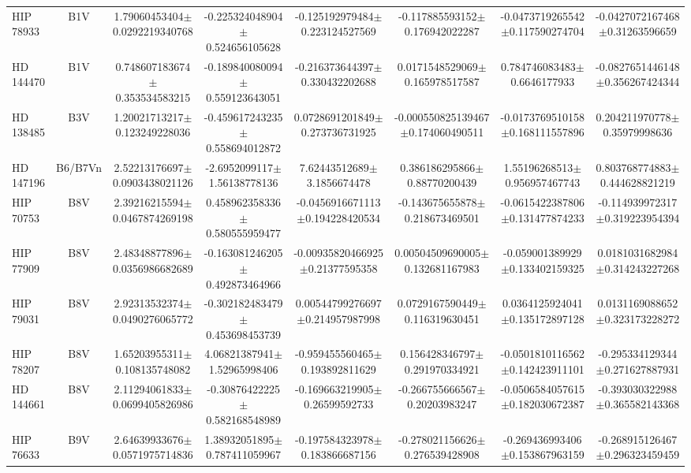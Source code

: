 \begin{table}
\begin{center}
\begin{tabular}{l|c|c|c|c|c|c|c}
HIP 78933 & B1V & 1.79060453404$\pm$0.0292219340768 & -0.225324048904$\pm$0.524656105628 & -0.125192979484$\pm$0.223124527569 & -0.117885593152$\pm$0.176942022287 & -0.0473719265542$\pm$0.117590274704 & -0.0427072167468$\pm$0.31263596659 \\
HD 144470 & B1V & 0.748607183674$\pm$0.353534583215 & -0.189840080094$\pm$0.559123643051 & -0.216373644397$\pm$0.330432202688 & 0.0171548529069$\pm$0.165978517587 & 0.784746083483$\pm$0.6646177933 & -0.0827651446148$\pm$0.356267424344 \\
HD 138485 & B3V & 1.20021713217$\pm$0.123249228036 & -0.459617243235$\pm$0.558694012872 & 0.0728691201849$\pm$0.273736731925 & -0.000550825139467$\pm$0.174060490511 & -0.0173769510158$\pm$0.168111557896 & 0.204211970778$\pm$0.35979998636 \\
HD 147196 & B6/B7Vn & 2.52213176697$\pm$0.0903438021126 & -2.6952099117$\pm$1.56138778136 & 7.62443512689$\pm$3.1856674478 & 0.386186295866$\pm$0.88770200439 & 1.55196268513$\pm$0.956957467743 & 0.803768774883$\pm$0.444628821219 \\
HIP 70753 & B8V & 2.39216215594$\pm$0.0467874269198 & 0.458962358336$\pm$0.580555959477 & -0.0456916671113$\pm$0.194228420534 & -0.143675655878$\pm$0.218673469501 & -0.0615422387806$\pm$0.131477874233 & -0.114939972317$\pm$0.319223954394 \\
HIP 77909 & B8V & 2.48348877896$\pm$0.0356986682689 & -0.163081246205$\pm$0.492873464966 & -0.00935820466925$\pm$0.21377595358 & 0.00504509690005$\pm$0.132681167983 & -0.059001389929$\pm$0.133402159325 & 0.0181031682984$\pm$0.314243227268 \\
HIP 79031 & B8V & 2.92313532374$\pm$0.0490276065772 & -0.302182483479$\pm$0.453698453739 & 0.00544799276697$\pm$0.214957987998 & 0.0729167590449$\pm$0.116319630451 & 0.0364125924041$\pm$0.135172897128 & 0.0131169088652$\pm$0.323173228272 \\
HIP 78207 & B8V & 1.65203955311$\pm$0.108135748082 & 4.06821387941$\pm$1.52965998406 & -0.959455560465$\pm$0.193892811629 & 0.156428346797$\pm$0.291970334921 & -0.0501810116562$\pm$0.142423911101 & -0.295334129344$\pm$0.271627887931 \\
HD 144661 & B8V & 2.11294061833$\pm$0.0699405826986 & -0.30876422225$\pm$0.582168548989 & -0.169663219905$\pm$0.26599592733 & -0.266755666567$\pm$0.20203983247 & -0.0506584057615$\pm$0.182030672387 & -0.393030322988$\pm$0.365582143368 \\
HIP 76633 & B9V & 2.64639933676$\pm$0.0571975714836 & 1.38932051895$\pm$0.787411059967 & -0.197584323978$\pm$0.183866687156 & -0.278021156626$\pm$0.276539428908 & -0.269436993406$\pm$0.153867963159 & -0.268915126467$\pm$0.296323459459 \\

\end{tabular}
\end{center}
\end{table}
